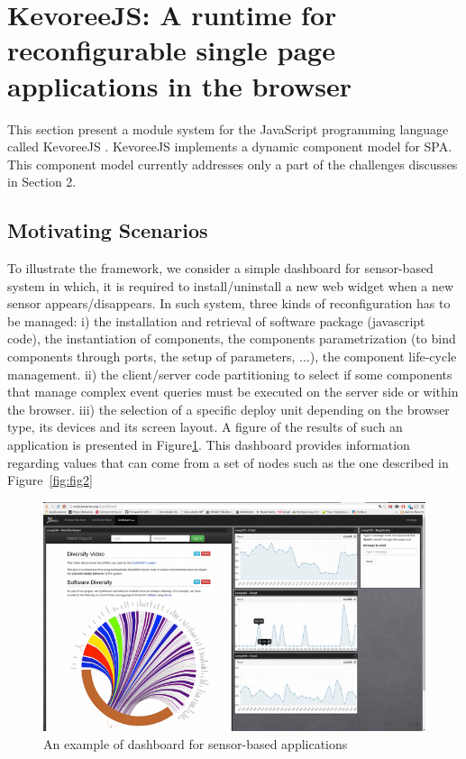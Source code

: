 \section{KevoreeJS: A runtime for reconfigurable single page applications in the browser}

This section present a module system for the JavaScript programming language called KevoreeJS . 
KevoreeJS implements a dynamic component model for SPA. 
This component model currently addresses only a part of the challenges discusses in Section 2.   

\subsection{Motivating Scenarios }
To illustrate the framework, we consider a simple dashboard for sensor-based system in which, it is required to install/uninstall a new web widget when a new sensor appears/disappears. In such system, three kinds of reconfiguration has to be managed: i) the installation and retrieval of software package (javascript code), the instantiation of components, the components parametrization (to bind components through ports, the setup of parameters, ...), the component life-cycle management. ii)  the client/server code partitioning to select if some components that manage complex event queries must be executed on the server side or within the browser. iii) the selection of a specific  deploy unit depending on the browser type, its devices and its screen layout. A figure of the results of such an application is presented in Figure\ref{fig:fig1}.   This dashboard provides information regarding values that can come from a set of nodes such as the one described in Figure~\ref{fig:fig2}


\begin{figure}[h]
	\centering
	\includegraphics[width=1\linewidth]{figures/fig3}
	\caption{An example of dashboard for sensor-based applications}
	\label{fig:fig1}
\end{figure}


